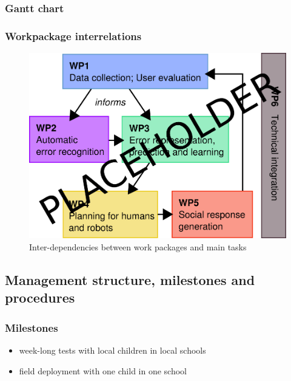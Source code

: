 \documentclass[11pt]{article}
\begin{document}
\subsubsection{Gantt chart}\label{gantt-chart}

\begin{landscape}

\end{landscape}

\subsubsection{Workpackage interrelations}\label{workpackage-interrelations}

\begin{figure}[!htbp]
    \centering
    \includegraphics[width=0.8\linewidth]{figs/wp-interrelations}
    \caption{Inter-dependencies between work packages and main tasks}
    \label{}
\end{figure}



\subsection{Management structure, milestones and procedures}\label{management-structure-milestones-and-procedures}

\subsubsection{Milestones}\label{milestones}

\begin{itemize}

\item   week-long tests with local children in local schools
\item   field deployment with one child in one school
\end{itemize}
\end{document}
